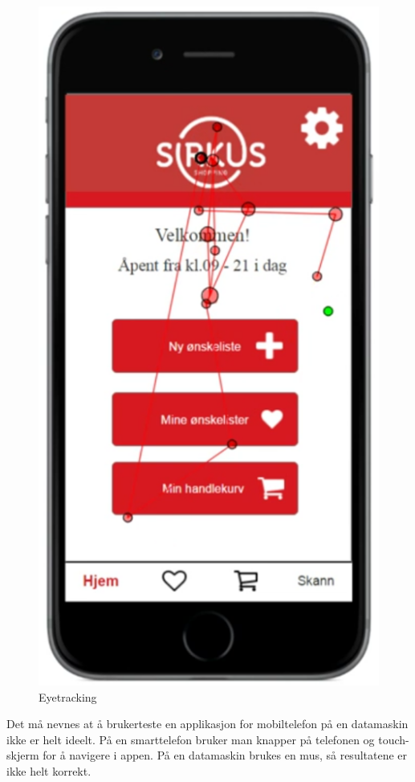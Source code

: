 \begin{figure}[H]
\includegraphics[scale=0.5]{images/eyetracking/eyetrack1.png}
\centering %
\caption{Eyetracking}
\label{fig:eyetrack1}
\end{figure}

\noindent Det må nevnes at å brukerteste en applikasjon for mobiltelefon på en datamaskin ikke er helt ideelt. På en smarttelefon bruker man knapper på telefonen og touch-skjerm for å navigere i appen. På en datamaskin brukes en mus, så resultatene er ikke helt korrekt. 
